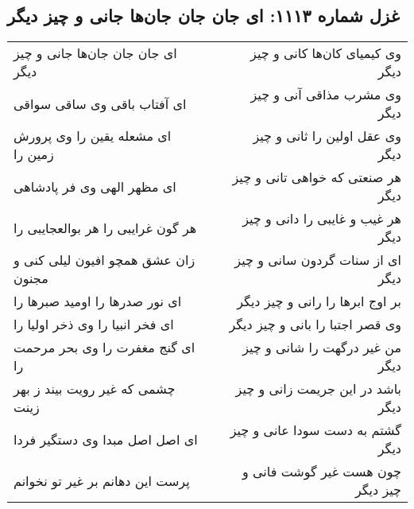 \begin{center}
\section*{غزل شماره ۱۱۱۳: ای جان جان جان‌ها جانی و چیز دیگر}
\label{sec:1113}
\begin{longtable}{l p{0.5cm} r}
ای جان جان جان‌ها جانی و چیز دیگر
&&
وی کیمیای کان‌ها کانی و چیز دیگر
\\
ای آفتاب باقی وی ساقی سواقی
&&
وی مشرب مذاقی آنی و چیز دیگر
\\
ای مشعله یقین را وی پرورش زمین را
&&
وی عقل اولین را ثانی و چیز دیگر
\\
ای مظهر الهی وی فر پادشاهی
&&
هر صنعتی که خواهی تانی و چیز دیگر
\\
هر گون غرایبی را هر بوالعجایبی را
&&
هر غیب و غایبی را دانی و چیز دیگر
\\
زان عشق همچو افیون لیلی کنی و مجنون
&&
ای از سنات گردون سانی و چیز دیگر
\\
ای نور صدرها را اومید صبرها را
&&
بر اوج ابرها را رانی و چیز دیگر
\\
ای فخر انبیا را وی ذخر اولیا را
&&
وی قصر اجتبا را بانی و چیز دیگر
\\
ای گنج مغفرت را وی بحر مرحمت را
&&
من غیر درگهت را شانی و چیز دیگر
\\
چشمی که غیر رویت بیند ز بهر زینت
&&
باشد در این جریمت زانی و چیز دیگر
\\
ای اصل اصل مبدا وی دستگیر فردا
&&
گشتم به دست سودا عانی و چیز دیگر
\\
پرست این دهانم بر غیر تو نخوانم
&&
چون هست غیر گوشت فانی و چیز دیگر
\\
\end{longtable}
\end{center}
